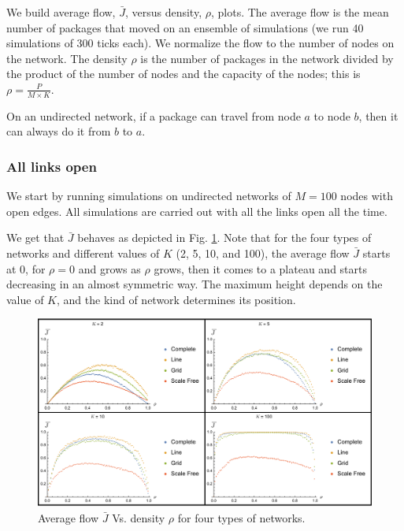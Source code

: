 \documentclass[12pt]{article}
\begin{document}
We build average flow, $\bar{J}$, versus density, $\rho$, plots.
The average flow is the mean number of packages that moved on an ensemble of simulations (we run 40 simulations of 300 ticks each). 
We normalize the flow to the number of nodes on the network.
The density $\rho$ is the number of packages in the network divided by the product of the number of nodes and the capacity of the nodes; this is $\rho = \frac{P}{M \times K}$.

On an undirected network, if a package can travel from node $a$ to node $b$, then it can always do it from $b$ to $a$.


\subsubsection{All links open}
\label{sec:undirected-open}

We start by running simulations on undirected networks of $M=100$ nodes with open edges.
All simulations are carried out with all the links open all the time. 

We get that $\bar{J}$ behaves as depicted in Fig. \ref{fig:JvsrhoAllOpen}.
Note that for the four types of networks and different values of $K$ (2, 5, 10, and 100), the average flow $\bar{J}$ starts at 0, for $\rho=0$ and grows as $\rho$ grows, then it comes to a plateau and starts decreasing in an almost symmetric way.
The maximum height depends on the value of $K$, and the kind of network determines its position.

\begin{figure}[!hbt]
  \centering
  \includegraphics[width=\textwidth]{plots/fundamentalUndirected.pdf}
  \caption{Average flow $\bar{J}$ Vs. density $\rho$ for four types of networks.}
  \label{fig:JvsrhoAllOpen}
\end{figure}
\end{document}
